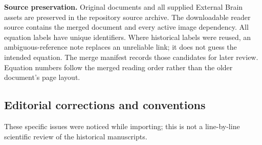 \documentclass{article}
\begin{document}
\textbf{Source preservation.} Original documents and all supplied External Brain assets are preserved in the repository source archive. The downloadable reader source contains the merged document and every active image dependency. All equation labels have unique identifiers. Where historical labels were reused, an ambiguous-reference note replaces an unreliable link; it does not guess the intended equation. The merge manifest records those candidates for later review. Equation numbers follow the merged reading order rather than the older document's page layout.

\subsection*{Editorial corrections and conventions}
These specific issues were noticed while importing; this is not a line-by-line scientific review of the historical manuscripts.
\end{document}
